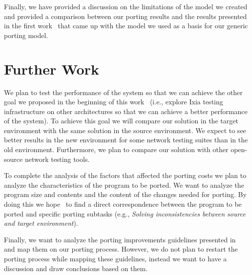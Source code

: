 Finally, we have provided a discussion on the limitations of the model we
created and provided a comparison between our porting results and the results
presented in the first work~\cite{hakuta} that came up with the model we used as a
basis for our generic porting model.

\section{Further Work}

We plan to test the performance of the system so that we can achieve the other
goal we proposed in the beginning of this work~ (i.e., explore Ixia testing
infrastructure on other architectures so that we can achieve a better
performance of the system). To achieve this goal we will compare our solution in
the target environment with the same solution in the source environment. We
expect to see better results in the new environment for some network testing
suites than in the old environment. Furthermore, we plan to compare our solution
with other open-source network testing tools.~

To complete the analysis of the factors that affected the porting costs we plan
to analyze the characteristics of the program to be ported. We want to analyze
the program size and contents and the content of the changes needed for porting.
By doing this we hope~ to find a direct correspondence between the program to be
ported and specific porting subtasks (e.g., \textit{Solving inconsistencies
between source and target environment}).

Finally, we want to analyze the porting improvements guidelines presented
in~\cite{hakuta} and map them on our porting process. However, we do not plan to
restart the porting process while mapping these guidelines, instead we want to
have a discussion and draw conclusions based on them.

